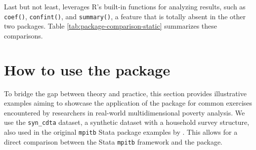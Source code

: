 Last but not least,  leverages R's built-in functions for analyzing results, such as \texttt{coef()}, \texttt{confint()}, and \texttt{summary()}, a feature that is totally absent in the other two packages. Table \ref{tab:package-comparison-static} summarizes these comparisons.

\begin{table}
\centering
\caption{\label{tab:package-comparison-static}Comparison of R Packages for Multidimensional Poverty Calculation}
\centering
{}
\end{table}

\section{How to use the package}\label{how-to-use-the-package}

To bridge the gap between theory and practice, this section provides illustrative examples aiming to showcase the application of the  package for common exercises encountered by researchers in real-world multidimensional poverty analysis. We use the \texttt{syn\_cdta} dataset, a synthetic dataset with a household survey structure, also used in the original \texttt{mpitb} Stata package examples by \citet{mpitb_Stata}. This allows for a direct comparison between the Stata \texttt{mpitb} framework and the  package.

